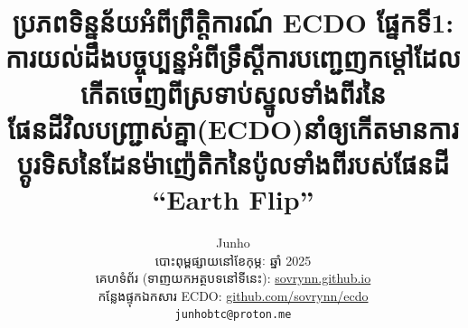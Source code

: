 \documentclass[10pt,twocolumn,letterpaper]{article}
\begin{document}
\title{ប្រភពទិន្នន័យអំពីព្រឹត្តិការណ៍ ECDO ផ្នែកទី1: ការយល់ដឹងបច្ចុប្បន្នអំពីទ្រឹស្តីការបញ្ជេញកម្តៅដែលកើតចេញពីស្រទាប់ស្នូលទាំងពីរនៃផែនដីវិលបញ្ជ្រាស់គ្នា(ECDO)នាំឲ្យកើតមានការប្តូរទិសនៃដែនម៉ាញ៉េតិកនៃប៉ូលទាំងពីរបស់ផែនដី “Earth Flip”}

\author{Junho\\
បោះពុម្ពផ្សាយនៅខែកុម្ភៈ ឆ្នាំ 2025\\
គេហទំព័រ (ទាញយកអត្ថបទនៅទីនេះ): \href{https://sovrynn.github.io}{sovrynn.github.io}\\
កន្លែងផ្ទុកឯកសារ ECDO: \href{https://github.com/sovrynn/ecdo}{github.com/sovrynn/ecdo}\\
{\tt\small junhobtc@proton.me}
}

\maketitle
\end{document}
